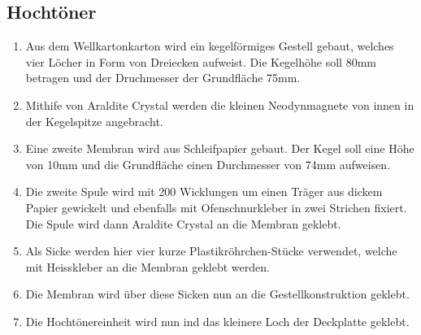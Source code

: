 \documentclass[a4paper,11pt]{report}
\begin{document}
\subsection{Hochtöner}
\begin{enumerate}
    \item Aus dem Wellkartonkarton wird ein kegelförmiges Gestell gebaut, welches vier Löcher in Form von Dreiecken aufweist. Die Kegelhöhe soll 80mm betragen und der Druchmesser der Grundfläche 75mm.
    \item Mithife von Araldite Crystal werden die kleinen Neodynmagnete von innen in der Kegelspitze angebracht.
    \item Eine zweite Membran wird aus Schleifpapier gebaut. Der Kegel soll eine Höhe von 10mm und die Grundfläche einen Durchmesser von 74mm aufweisen.
    \item Die zweite Spule wird mit 200 Wicklungen um einen Träger aus dickem Papier gewickelt und ebenfalls mit Ofenschnurkleber in zwei Strichen fixiert. Die Spule wird dann  Araldite Crystal an die Membran geklebt.
    \item Als Sicke werden hier vier kurze Plastikröhrchen-Stücke verwendet, welche mit Heisskleber an die Membran geklebt werden.
    \item Die Membran wird über diese Sicken nun an die Gestellkonstruktion geklebt.
    \item Die Hochtönereinheit wird nun ind das kleinere Loch der Deckplatte geklebt.
\end{enumerate}
\end{document}
